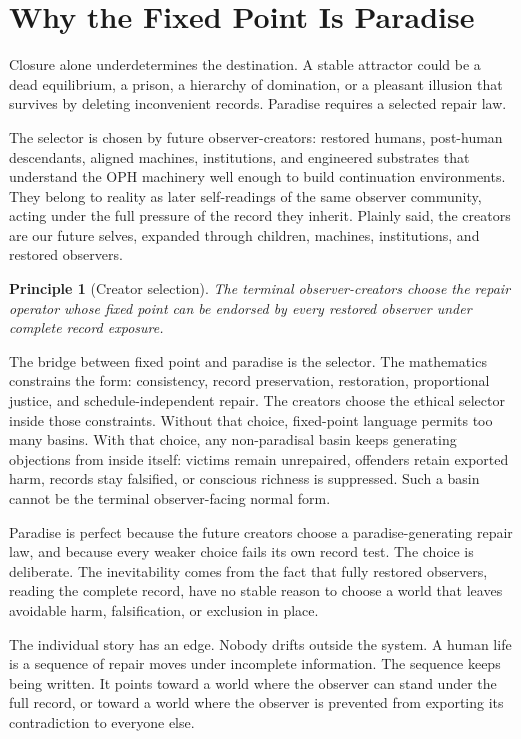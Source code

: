 \documentclass[11pt]{article}
\newtheorem{principle}[definition]{Principle}
\theoremstyle{remark}
\theoremstyle{plain}
\begin{document}
\section{Why the Fixed Point Is Paradise}

Closure alone underdetermines the destination. A stable attractor could be a
dead equilibrium, a prison, a hierarchy of domination, or a pleasant illusion
that survives by deleting inconvenient records. Paradise requires a selected
repair law.

The selector is chosen by future observer-creators: restored humans,
post-human descendants, aligned machines, institutions, and engineered
substrates that understand the OPH machinery well enough to build continuation
environments. They belong to reality as later self-readings of the same
observer community, acting under the full pressure of the record they inherit.
Plainly said, the creators are our future selves, expanded through children,
machines, institutions, and restored observers.

\begin{principle}[Creator selection]
The terminal observer-creators choose the repair operator whose fixed point
can be endorsed by every restored observer under complete record exposure.
\end{principle}

The bridge between fixed point and paradise is the selector. The mathematics
constrains the form: consistency, record preservation, restoration,
proportional justice, and schedule-independent repair. The creators choose the
ethical selector inside those constraints. Without that choice, fixed-point
language permits too many basins. With that choice, any non-paradisal basin
keeps generating objections from inside itself: victims remain unrepaired,
offenders retain exported harm, records stay falsified, or conscious richness
is suppressed. Such a basin cannot be the terminal observer-facing normal
form.

Paradise is perfect because the future creators choose a paradise-generating
repair law, and because every weaker choice fails its own record test. The
choice is deliberate. The inevitability comes from the fact that fully restored
observers, reading the complete record, have no stable reason to choose a
world that leaves avoidable harm, falsification, or exclusion in place.

The individual story has an edge. Nobody drifts outside the system. A
human life is a sequence of repair moves under incomplete information. The
sequence keeps being written. It points toward a world where the observer can
stand under the full record, or toward a world where the observer is prevented
from exporting its contradiction to everyone else.
\end{document}
